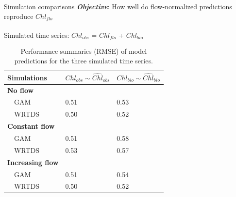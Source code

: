 \documentclass[serif]{beamer}\usepackage[]{graphicx}\usepackage[]{color}
\newcommand{\Bigtxt}[1]{\textbf{\textit{#1}}}
\begin{document}
\begin{frame}{Simulation comparisons}
\Bigtxt{Objective}: How well do flow-normalized predictions reproduce $Chl_{flo}$ \\~\\
Simulated time series: $Chl_{obs}$ = $Chl_{flo}$ + $Chl_{bio}$
\scriptsize
\begin{table}[!tbp]
\caption{Performance summaries (RMSE) of model predictions for the three simulated time series.\label{tab:simperf}} 
\begin{center}
\begin{tabular}{lll}
\hline\hline
\multicolumn{1}{l}{Simulations}&\multicolumn{1}{c}{$Chl_{obs} \sim \widehat{Chl}_{obs}$}&\multicolumn{1}{c}{$Chl_{bio} \sim \widehat{Chl}_{bio}$}\tabularnewline
\hline
{\bfseries No flow}&&\tabularnewline
~~GAM&0.51&0.53\tabularnewline
~~WRTDS&0.50&0.52\tabularnewline
\hline
{\bfseries Constant flow}&&\tabularnewline
~~GAM&0.51&0.58\tabularnewline
~~WRTDS&0.53&0.57\tabularnewline
\hline
{\bfseries Increasing flow}&&\tabularnewline
~~GAM&0.51&0.54\tabularnewline
~~WRTDS&0.50&0.52\tabularnewline
\hline
\end{tabular}\end{center}

\end{table}

\end{frame}
\end{document}
